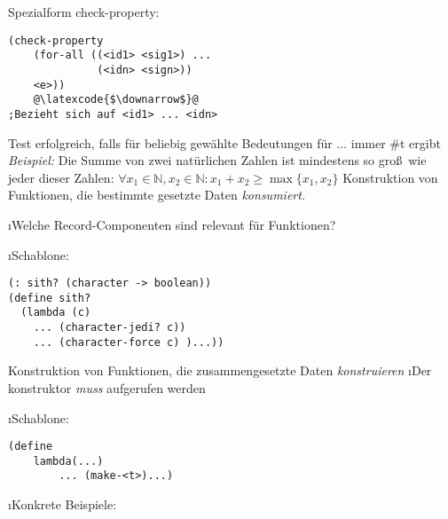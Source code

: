 Spezialform check-property:\\
\begin{lstlisting}
(check-property
	(for-all ((<id1> <sig1>) ... 
			  (<idn> <sign>))
	<e>))
	@\latexcode{$\downarrow$}@
;Bezieht sich auf <id1> ... <idn>	
\end{lstlisting}
Test erfolgreich, falls \arge{} für beliebig gewählte Bedeutungen für  $\ldots$  immer \#t ergibt\\
\emph{Beispiel:} Die Summe von zwei natürlichen Zahlen ist mindestens so gro\ss \ wie jeder dieser Zahlen: $ \forall x_1 \in \mathbb{N}, x_2 \in \mathbb{N} : x_1 + x_2 \geq \max\{x_1,x_2\}$
Konstruktion von Funktionen, die bestimmte gesetzte Daten \emph{konsumiert}.\\
\begin{enumerate}[-]
\i Welche Record-Componenten sind relevant für Funktionen?
\begin{enumerate}[$\rightarrow$]
\i Schablone:
\begin{lstlisting}
(: sith? (character -> boolean))
(define sith?
  (lambda (c)
    ... (character-jedi? c))
    ... (character-force c) )...))
\end{lstlisting}
\end{enumerate}
Konstruktion von Funktionen, die zusammengesetzte Daten \emph{konstruieren}
\i Der konstruktor \emph{muss} aufgerufen werden
\begin{enumerate}[$\rightarrow$]
\i Schablone:
\begin{lstlisting}
(define
	lambda(...)
		... (make-<t>)...)
\end{lstlisting}
\end{enumerate}
\i Konkrete Beispiele:
\end{enumerate}
